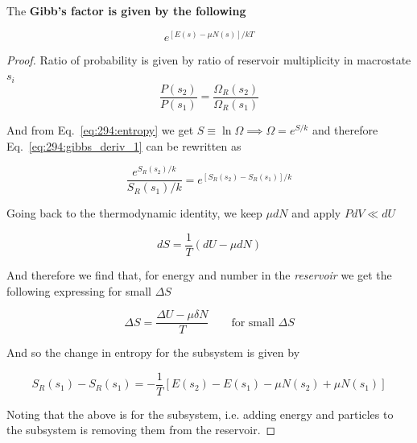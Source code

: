 \documentclass[10pt]{article}
\begin{document}
\begin{theorem}
	The \textbf{Gibb's factor is given by the following} 

	\begin{equation}
		e^{\left[ E(s) - \mu N(s) \right]/kT }
		\label{eq:294:gibbs_factor}
	\end{equation}
	

	\begin{proof}
		Ratio of probability is given by ratio of reservoir multiplicity in macrostate $ s_i $
		\begin{equation}
			\frac{P(s_2)}{P(s_1)} = \frac{\Omega_R(s_2)}{\Omega_R(s_1)} 
			\label{eq:294:gibbs_deriv_1}
		\end{equation}

		And from Eq.~\ref{eq:294:entropy} we get $ S \equiv \ln{\Omega}  \implies \Omega = e^{S/k} $ and therefore Eq.~\ref{eq:294:gibbs_deriv_1} can be rewritten as
		
		\begin{equation}
			\frac{e^{S_R(s_2) /k}}{S_R(s_1) /k} = e^{\left[ S_R(s_2) - S_R(s_1) \right]/k }
		\end{equation}

		Going back to the thermodynamic identity, we keep $ \mu dN $  and apply $PdV  \ll dU$

		\begin{equation}
			dS = \frac{1}{T} (dU - \mu dN)
		\end{equation}

		And therefore we find that, for energy and number in the \textit{reservoir} we get the following expressing for small $ \Delta S $ 

		\begin{equation}
			\Delta S = \frac{\Delta U - \mu \delta N}{T} \qquad \text{for small } \Delta S 
		\end{equation}

		And so the change in entropy for the subsystem is given by

		\begin{equation}
			S_R(s_1) - S_R(s_1) = -\frac{1}{T} \left[ E(s_2) - E(s_1) - \mu N(s_2) + \mu N(s_1)  \right]
		\end{equation}

		Noting that the above is for the subsystem, i.e. adding energy and particles to the subsystem is removing them from the reservoir.


\end{proof}
\end{theorem}
\end{document}
